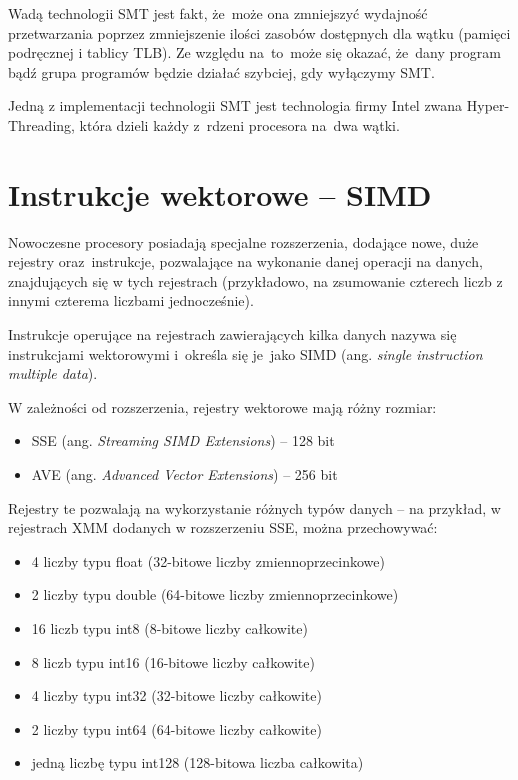 Wadą technologii SMT jest fakt, że~może ona zmniejszyć wydajność przetwarzania poprzez zmniejszenie ilości zasobów dostępnych dla wątku (pamięci podręcznej i tablicy TLB). Ze względu na~to~może się okazać, że~dany program bądź grupa programów będzie działać szybciej, gdy wyłączymy SMT.

Jedną z implementacji technologii SMT jest technologia firmy Intel zwana Hyper-Threading, która dzieli każdy z~rdzeni procesora na~dwa wątki. \cite{ModernMicroprocessors90MinGuide}


\section{Instrukcje wektorowe -- SIMD}
\label{sec:SIMD}

Nowoczesne procesory posiadają specjalne rozszerzenia, dodające nowe, duże rejestry oraz~instrukcje, pozwalające na wykonanie danej operacji na danych, znajdujących się w tych rejestrach (przykładowo, na zsumowanie czterech liczb z innymi czterema liczbami jednocześnie).

Instrukcje operujące na rejestrach zawierających kilka danych nazywa się instrukcjami wektorowymi i~określa się je~jako SIMD (ang. \textit{single instruction multiple data}).

W zależności od rozszerzenia, rejestry wektorowe mają różny rozmiar:

\begin{itemize}
    \item SSE (ang. \textit{Streaming SIMD Extensions}) -- 128 bit
    \item AVE (ang. \textit{Advanced Vector Extensions}) -- 256 bit
\end{itemize}

Rejestry te pozwalają na wykorzystanie różnych typów danych -- na przykład, w rejestrach XMM dodanych w rozszerzeniu SSE, można przechowywać:

\begin{itemize}
    \item 4 liczby typu float (32-bitowe liczby zmiennoprzecinkowe)
    \item 2 liczby typu double (64-bitowe liczby zmiennoprzecinkowe)
    \item 16 liczb typu int8 (8-bitowe liczby całkowite)
    \item 8 liczb typu int16 (16-bitowe liczby całkowite)
    \item 4 liczby typu int32 (32-bitowe liczby całkowite)
    \item 2 liczby typu int64 (64-bitowe liczby całkowite)
    \item jedną 	liczbę typu int128 (128-bitowa liczba całkowita)
\end{itemize}

